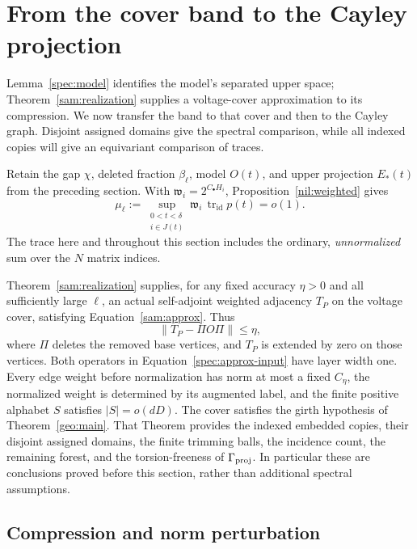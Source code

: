 \section{From the cover band to the Cayley projection}
\label{spec:section}

Lemma~\ref{spec:model} identifies the model's separated upper space;
Theorem~\ref{sam:realization} supplies a voltage-cover approximation to its
compression.
We now transfer the band to that cover and then to the Cayley graph.
Disjoint assigned domains give the spectral comparison, while all indexed
copies will give an equivariant comparison of traces.

Retain the gap $\chi$, deleted fraction $\beta_\ell$, model $O(t)$, and
upper projection $E_*(t)$ from the preceding section. With
$\mathfrak w_i=2^{C_\bullet H_i}$, Proposition~\ref{nil:weighted} gives
\begin{equation}
 \mu_\ell:=\sup_{\substack{0<t<\delta\\i\in J(t)}}
       \mathfrak w_i\,\operatorname{tr}_{\mathrm{id}}p(t)=o(1).
 \label{spec:weighted-input}
\end{equation}
The trace here and throughout this section includes the ordinary,
\emph{unnormalized} sum over the $N$ matrix indices.

Theorem~\ref{sam:realization} supplies, for any fixed accuracy $\eta>0$ and
all sufficiently large $\ell$, an actual self-adjoint weighted adjacency
$T_P$ on the voltage cover, satisfying
Equation~\eqref{sam:approx}.  Thus
\begin{equation}
  \|T_P-\Pi O\Pi\|\leq\eta,
  \label{spec:approx-input}
\end{equation}
where $\Pi$ deletes the removed base vertices, and $T_P$ is extended by zero
on those vertices.  Both operators in Equation~\eqref{spec:approx-input}
have layer width one.  Every edge weight before normalization has norm at
most a fixed $C_\eta$, the normalized weight is determined by its augmented
label, and the finite positive alphabet $S$ satisfies $|S|=o(dD)$.  The cover
satisfies the girth hypothesis of Theorem~\ref{geo:main}.  That Theorem
provides the indexed embedded copies, their disjoint assigned domains, the
finite trimming balls, the incidence count, the remaining forest, and the
torsion-freeness of $\Gamma_{\mathrm{proj}}$.  In particular these are conclusions proved
before this section, rather than additional spectral assumptions.

\subsection{Compression and norm perturbation}

